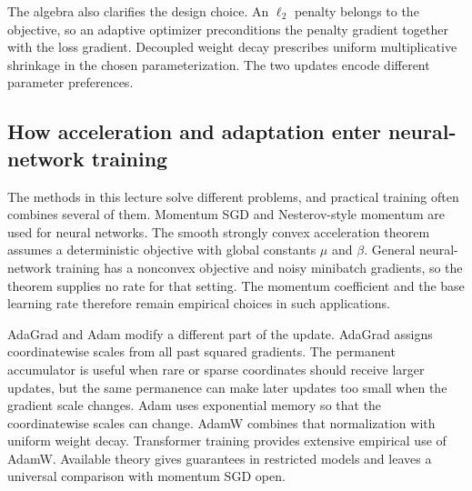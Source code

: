 \documentclass[11pt,twoside]{article}
\theoremstyle{definition}
\theoremstyle{remark}
\begin{document}
The algebra also clarifies the design choice. An $\ell_2$ penalty belongs to
the objective, so an adaptive optimizer preconditions the penalty gradient
together with the loss gradient. Decoupled weight decay prescribes uniform
multiplicative shrinkage in the chosen parameterization. The two updates
encode different parameter preferences.

\subsection{How acceleration and adaptation enter neural-network training}

The methods in this lecture solve different problems, and practical training
often combines several of them. Momentum SGD and Nesterov-style momentum are
used for neural networks. The smooth strongly convex acceleration theorem
assumes a deterministic objective with global constants $\mu$ and $\beta$.
General neural-network training has a nonconvex objective and noisy minibatch
gradients, so the theorem supplies no rate for that setting. The momentum
coefficient and the base learning rate therefore remain empirical choices in
such applications.

AdaGrad and Adam modify a different part of the update. AdaGrad assigns
coordinatewise scales from all past squared gradients. The permanent
accumulator is useful when rare or sparse coordinates should receive larger
updates, but the same permanence can make later updates too small when the
gradient scale changes. Adam uses exponential memory so that the
coordinatewise scales can change. AdamW combines that normalization with
uniform weight decay. Transformer training provides extensive empirical use
of AdamW. Available theory gives guarantees in restricted models and leaves a
universal comparison with momentum SGD open.
\end{document}
